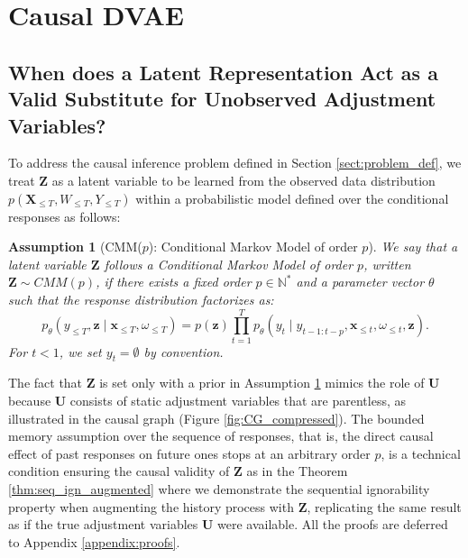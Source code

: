 \documentclass[10pt]{article} %
\newtheorem{assumption}[theorem]{Assumption}
\begin{document}
\section{Causal DVAE}
\label{sect:causal_dvae}

\subsection{When does a Latent Representation Act as a Valid Substitute for Unobserved Adjustment Variables?}
\label{sect:CMM}
To address the causal inference problem defined in Section \ref{sect:problem_def}, we treat \(\mathbf{Z}\) as a latent variable to be learned from the observed data distribution \(p(\mathbf{X}_{\leq T}, W_{\leq T}, Y_{\leq T})\) within a probabilistic model defined over the conditional responses as follows:
\begin{assumption}[CMM($p$): Conditional Markov Model of order $p$]
\label{assp:cmm_y}
We say that a latent variable $\mathbf{Z}$ follows a Conditional Markov Model of order $p$, written \(\mathbf{Z} \sim CMM(p)\), if there exists a fixed order \( p \in \mathbb{N}^* \) and a parameter vector \( \theta \) such that the response distribution factorizes as:  
\[
p_\theta(y_{\leq T} , \mathbf{z} \mid  \mathbf{x}_{\leq T}, \omega_{\leq T}) = p(\mathbf{z})\prod_{t = 1}^T p_\theta\left(y_t \mid y_{t-1:t-p}, \mathbf{x}_{\leq t}, \omega_{\leq t}, \mathbf{z}\right).
\]
For \( t < 1 \), we set \( y_t = \emptyset \) by convention.
\end{assumption}

The fact that \(\mathbf{Z}\) is set only with a prior in Assumption \ref{assp:cmm_y} mimics the role of \(\mathbf{U}\) because \(\mathbf{U}\) consists of static adjustment variables that are parentless, as illustrated in the causal graph (Figure \ref{fig:CG_compressed}). The bounded memory assumption over the sequence of responses, that is, the direct causal effect of past responses on future ones stops at an arbitrary order \(p\), is a technical condition ensuring the causal validity of \(\mathbf{Z}\) as in the Theorem \ref{thm:seq_ign_augmented} where we demonstrate the sequential ignorability property when augmenting the history process with \(\mathbf{Z}\), replicating the same result as if the true adjustment variables \(\mathbf{U}\) were available. All the proofs are deferred to Appendix \ref{appendix:proofs}.
\end{document}
